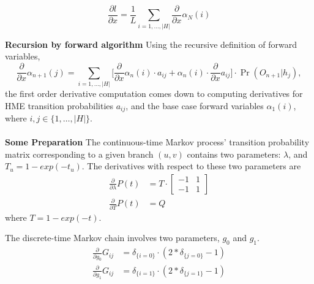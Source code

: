\documentclass[11pt]{article}
\begin{document}
$$\frac{\partial l}{\partial x}
= \frac{1}{L}\sum_{i=1,\ldots, |H|}\frac{\partial }{\partial x} \alpha_{N}(i) $$


\noindent\textbf{Recursion by forward algorithm}
Using the recursive definition of forward variables,
$$\frac{\partial }{\partial x} \alpha_{n+1}(j) =
\sum_{i=1,\ldots, |H|} \big[\frac{\partial }{\partial x}\alpha_n(i) \cdot a_{ij} +\alpha_n(i)\cdot \frac{\partial }{\partial x}a_{ij} \big] \cdot \Pr(O_{n+1}|h_j), $$
the first order derivative computation comes down to computing
derivatives for HME transition probabilities $a_{ij}$, and the base case
forward variables $\alpha_1(i)$, where $i, j \in \{1, \ldots, |H|\}$.
\\
\\
\noindent\textbf{Some Preparation}
The continuous-time Markov process' transition probability matrix
corresponding to a given branch $(u,v)$ contains two parameters:
$\lambda$, and $T_u=1-exp(-t_u)$. The derivatives with respect to
these two parameters are
\begin{equation}
\begin{aligned}
\frac{\partial}{\partial \lambda} P(t)
&= T\cdot\begin{bmatrix}
  -1 & 1 \\[0.3em]
  -1 & 1
\end{bmatrix}\\
\frac{\partial}{\partial T} P(t) &= Q
\end{aligned}
\end{equation}
where $T = 1-exp(-t)$.


The discrete-time Markov chain involves two parameters, $g_0$ and $g_1$.
\begin{equation}
\begin{aligned}
\frac{\partial}{\partial g_0} G_{ij} &= \delta_{\{i=0\}}\cdot (2*\delta_{\{j=0\}}-1)\\
\frac{\partial}{\partial g_1} G_{ij} &= \delta_{\{i=1\}}\cdot (2*\delta_{\{j=1\}}-1)
\end{aligned}
\end{equation}
\end{document}
